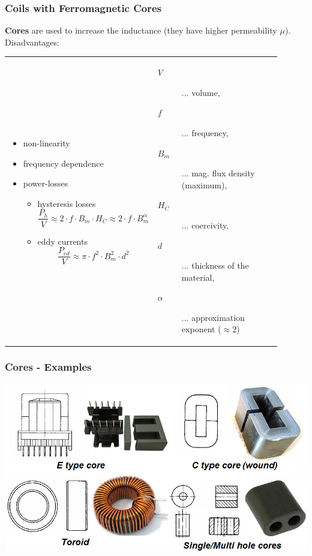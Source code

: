 \documentclass{beamer}
\begin{document}
	\begin{frame}
	\frametitle{Coils with Ferromagnetic Cores}
		\small
	\textbf{Cores} are used to increase the inductance (they have higher permeability $\mu$). Disadvantages:
	\begin{tabular}{m{0.45\linewidth} m{0.45\linewidth}}
	\begin{itemize}
		\item non-linearity
		\item frequency dependence
		\item power-losses
		\begin{itemize}
			\item hysteresis losses $$\frac{P_h}{V} \approx 2\cdot f\cdot B_m\cdot H_C \approx  2\cdot f\cdot B_m^\alpha$$
			\item eddy currents $$\frac{P_{ed}}{V} \approx \pi\cdot f^2\cdot B_m^2\cdot d^2 $$
		\end{itemize}
	\end{itemize}
	&
	\begin{description}
		\item[$V$]... volume,
	  \item[$f$]... frequency,
		\item[$B_m$]... mag. flux density (maximum),
		\item[$H_C$]... coercivity,
		\item[$d$]... thickness of the material,
		\item[$\alpha$]... approximation exponent ($\approx 2$)
	\end{description}
	\end{tabular}
  \end{frame}
	\begin{frame}
	\frametitle{Cores - Examples}
	\begin{center}
		\includegraphics[scale=0.4]{obr07_jadra.png}
	\end{center}
  \end{frame}
\end{document}
